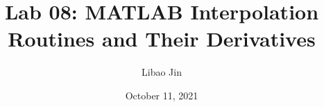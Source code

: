 \title{Lab 08: MATLAB Interpolation Routines and Their Derivatives}
\author{Libao Jin}
\date{October 11, 2021}